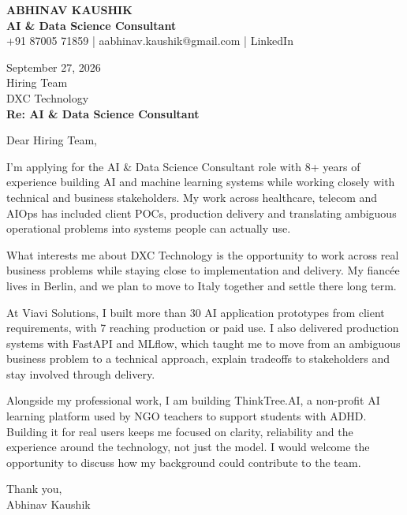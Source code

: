 \documentclass[10pt,a4paper]{article}
\begin{document}
\begin{center}
{\Large\bfseries ABHINAV KAUSHIK}\\[2pt]
{\bfseries AI \& Data Science Consultant}\\[2pt]
+91 87005 71859 \quad | \quad aabhinav.kaushik@gmail.com \quad | \quad LinkedIn
\end{center}
\vspace{8pt}
September 27, 2026\\[6pt]
Hiring Team\\
DXC Technology\\[4pt]
\textbf{Re: AI \& Data Science Consultant}

Dear Hiring Team,

I’m applying for the AI \& Data Science Consultant role with 8+ years of experience building AI and machine learning systems while working closely with technical and business stakeholders. My work across healthcare, telecom and AIOps has included client POCs, production delivery and translating ambiguous operational problems into systems people can actually use.

What interests me about DXC Technology is the opportunity to work across real business problems while staying close to implementation and delivery. My fiancée lives in Berlin, and we plan to move to Italy together and settle there long term.

At Viavi Solutions, I built more than 30 AI application prototypes from client requirements, with 7 reaching production or paid use. I also delivered production systems with FastAPI and MLflow, which taught me to move from an ambiguous business problem to a technical approach, explain tradeoffs to stakeholders and stay involved through delivery.

Alongside my professional work, I am building ThinkTree.AI, a non-profit AI learning platform used by NGO teachers to support students with ADHD. Building it for real users keeps me focused on clarity, reliability and the experience around the technology, not just the model. I would welcome the opportunity to discuss how my background could contribute to the team.

Thank you,\\
Abhinav Kaushik
\end{document}
